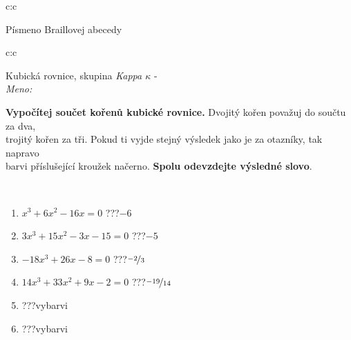 \documentclass[10pt]{report}
\begin{document}
\begin{tabular}{c:c}
\begin{minipage}[c][104.5mm][t]{0.5\linewidth}
\begin{center}
\begin{minipage}{0.20\linewidth}
\begin{center}
{\small Písmeno Braillovej abecedy}
\end{center}
\end{minipage}
\end{center}
\end{minipage}
%
\end{tabular}
\newpage
\thispagestyle{empty}
\begin{tabular}{c:c}
\begin{minipage}[c][104.5mm][t]{0.5\linewidth}
\begin{center}
\vspace{7mm}
{\huge Kubická rovnice, skupina \textit{Kappa $\kappa$} -}\\[5mm]
\textit{Meno:}\phantom{xxxxxxxxxxxxxxxxxxxxxxxxxxxxxxxxxxxxxxxxxxxxxxxxxxxxxxxxxxxxxxxxx}\\[5mm]
\begin{minipage}{0.95\linewidth}
\textbf{Vypočítej součet kořenů kubické rovnice.} Dvojitý kořen považuj do součtu za dva,\\trojitý kořen za tři. Pokud ti vyjde stejný výsledek jako je za otazníky, tak napravo\\barvi příslušející kroužek načerno. \textbf{Spolu odevzdejte výsledné slovo}.
\end{minipage}
\\[1mm]
\begin{minipage}{0.79\linewidth}
\begin{center}
\begin{varwidth}{\linewidth}
\begin{enumerate}
\Large
\item $x^3+6x^2-16x=0$\quad \dotfill\; ???\;\dotfill \quad $-6$
\item $3x^3+15x^2-3x-15=0$\quad \dotfill\; ???\;\dotfill \quad $-5$
\item $-18x^3+26x-8=0$\quad \dotfill\; ???\;\dotfill \quad $\nicefrac{-2}{3}$
\item $14x^3+33x^2+9x-2=0$\quad \dotfill\; ???\;\dotfill \quad $\nicefrac{-19}{14}$
\item \quad \dotfill\; ???\;\dotfill \quad vybarvi
\item \quad \dotfill\; ???\;\dotfill \quad vybarvi
\end{enumerate}
\end{varwidth}
\end{center}
\end{minipage}
\begin{minipage}{0.20\linewidth}
\begin{center}

\end{center}
\end{minipage}
\end{center}
\end{minipage}
\end{tabular}
\end{document}
